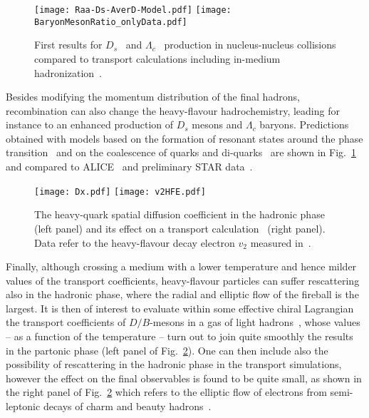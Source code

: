\documentclass{PoS}
\begin{document}
\begin{figure}[!ht]
\begin{center}
\texttt{[image: Raa-Ds-AverD-Model.pdf]}
\texttt{[image: BaryonMesonRatio\_onlyData.pdf]}
\caption{First results for $D_s$~\cite{Adam:2015jda} and $\Lambda_c$~\cite{Zhou:2017ikn} production in nucleus-nucleus collisions compared to transport calculations including in-medium hadronization~\cite{He:2014cla,Oh:2009zj}.}\label{fig:DsLambdac} 
\end{center}
\end{figure}
Besides modifying the momentum distribution of the final hadrons, recombination can also change the heavy-flavour hadrochemistry, leading for instance to an enhanced production of $D_s$ mesons and $\Lambda_c$ baryons. Predictions obtained with models based on the formation of resonant states around the phase transition~\cite{He:2014cla} and on the coalescence of quarks and di-quarks~\cite{Oh:2009zj} are shown in Fig.~\ref{fig:DsLambdac} and compared to ALICE~\cite{Adam:2015jda} and preliminary STAR data~\cite{Zhou:2017ikn}.

\begin{figure}[!ht]
\begin{center}
\texttt{[image: Dx.pdf]}
\texttt{[image: v2HFE.pdf]}
\caption{The heavy-quark spatial diffusion coefficient in the hadronic phase (left panel) and its effect on a transport calculation~\cite{Ozvenchuk:2014rpa} (right panel). Data refer to the heavy-flavour decay electron $v_2$ measured in~\cite{Adare:2006nq}.}\label{fig:hadronic} 
\end{center}
\end{figure}
Finally, although crossing a medium with a lower temperature and hence milder values of the transport coefficients, heavy-flavour particles can suffer rescattering also in the hadronic phase, where the radial and elliptic flow of the fireball is the largest. It is then of interest to evaluate within some effective chiral Lagrangian the transport coefficients of $D/B$-mesons in a gas of light hadrons~\cite{Ozvenchuk:2014rpa}, whose values -- as a function of the temperature -- turn out to join quite smoothly the results in the partonic phase (left panel of Fig.~\ref{fig:hadronic}). One can then include also the possibility of rescattering in the hadronic phase in the transport simulations, however the effect on the final observables is found to be quite small, as shown in the right panel of Fig.~\ref{fig:hadronic} which refers to the elliptic flow of electrons from semi-leptonic decays of charm and beauty hadrons~\cite{Adare:2006nq}.
\end{document}
